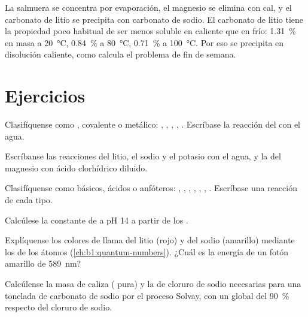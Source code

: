 La salmuera se concentra por evaporación, el magnesio se elimina con cal,
y el carbonato de litio se precipita con carbonato de sodio. El carbonato
de litio tiene la propiedad poco habitual de ser menos soluble en
caliente que en frío: \qty{1.31}{\percent} en masa a \qty{20}{\celsius},
\qty{0.84}{\percent} a \qty{80}{\celsius}, \qty{0.71}{\percent} a
\qty{100}{\celsius}. Por eso se precipita en disolución caliente, como
calcula el problema de fin de semana.

\section{Ejercicios}

\begin{exercise}[$\star$]\label{exo:b1:s-block:1}
Clasifíquense como , covalente o metálico: ,
, , , . Escríbase la reacción del
 con el agua.
\end{exercise}

\begin{exercise}[$\star$]\label{exo:b1:s-block:2}
Escríbanse las reacciones del litio, el sodio y el potasio con el agua, y
la del magnesio con ácido clorhídrico diluido.
\end{exercise}

\begin{exercise}[$\star$]\label{exo:b1:s-block:3}
Clasifíquense como básicos, ácidos o anfóteros: , ,
, , , , . Escríbase una
reacción de cada tipo.
\end{exercise}

\begin{exercise}[$\star$]\label{exo:b1:s-block:4}
Calcúlese la constante de  a pH 14 a
partir de los .
\end{exercise}

\begin{exercise}[$\star\star$]\label{exo:b1:s-block:5}
Explíquense los colores de llama del litio (rojo) y del sodio (amarillo)
mediante los  de los átomos
(\cref{ch:b1:quantum-numbers}). ¿Cuál es la energía de un fotón amarillo
de \qty{589}{nm}?
\end{exercise}

\begin{exercise}[$\star\star$]\label{exo:b1:s-block:6}
Calcúlense la masa de caliza ( pura) y la de cloruro de sodio
necesarias para una tonelada de carbonato de sodio por el proceso Solvay,
con un  global del \qty{90}{\percent} respecto del cloruro de
sodio.
\end{exercise}

